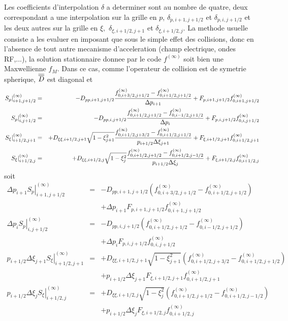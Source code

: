 Les coefficients d'interpolation $\delta $ a determiner sont au nombre de
quatre, deux correspondant a une interpolation sur la grille en $p$, $\delta
_{p,i+1,j+1/2}$ et $\delta _{p,i,j+1/2}$ et les deux autres sur la grille en 
$\xi ,$ $\delta _{\xi ,i+1/2,j+1}$ et $\delta _{\xi ,i+1/2,j}.$ La methode
usuelle consiste a les evaluer en imposant que sous le simple effet des
collisions, donc en l'absence de tout autre mecanisme d'acceleration (champ
electrique, ondes RF,...), la solution stationnaire donnee par le code $%
f^{\left( \infty \right) }$ soit bien une Maxwellienne $f_{M}$. Dans ce cas,
comme l'operateur de collision est de symetrie spherique, $\overline{%
\overline{D}}$ est diagonal et 
\begin{eqnarray*}
\left. S_{p}\right| _{i+1,j+1/2}^{(\infty )} &=&-D_{pp,i+1,j+1/2}\frac{%
f_{0,i+3/2,j+1/2}^{(\infty )}-f_{0,i+1/2,j+1/2}^{(\infty )}}{\Delta p_{i+1}}%
+F_{p,i+1,j+1/2}f_{0,i+1,j+1/2}^{(\infty )} \\
\left. S_{p}\right| _{i,j+1/2}^{(\infty )} &=&-D_{pp,i,j+1/2}\frac{%
f_{0,i+1/2,j+1/2}^{(\infty )}-f_{0,i-1/2,j+1/2}^{(\infty )}}{\Delta p_{i}}%
+F_{p,i,j+1/2}f_{0,i,j+1/2}^{(\infty )} \\
\left. S_{\xi }\right| _{i+1/2,j+1}^{(\infty )} &=&+D_{\xi \xi ,i+1/2,j+1}%
\sqrt{1-\xi _{j+1}^{2}}\frac{f_{0,i+1/2,j+3/2}^{(\infty %
)}-f_{0,i+1/2,j+1/2}^{(\infty )}}{p_{i+1/2}\Delta \xi _{j+1}}+F_{\xi
,i+1/2,j+1}f_{0,i+1/2,j+1}^{(\infty )} \\
\left. S_{\xi }\right| _{i+1/2,j}^{(\infty )} &=&+D_{\xi \xi ,i+1/2,j}\sqrt{%
1-\xi _{j}^{2}}\frac{f_{0,i+1/2,j+1/2}^{(\infty )}-f_{0,i+1/2,j-1/2}^{(%
\infty )}}{p_{i+1/2}\Delta \xi _{j}}+F_{\xi ,i+1/2,j}f_{0,i+1/2,j}^{(\infty %
)}
\end{eqnarray*}
soit 
\begin{eqnarray*}
\Delta p_{i+1}\left. S_{p}\right| _{i+1,j+1/2}^{(\infty )}
&=&-D_{pp,i+1,j+1/2}\left( f_{0,i+3/2,j+1/2}^{(\infty )}-f_{0,i+1/2,j+1/2}^{(%
\infty )}\right)  \\
&&+\Delta p_{i+1}F_{p,i+1,j+1/2}f_{0,i+1,j+1/2}^{(\infty )} \\
\Delta p_{i}\left. S_{p}\right| _{i,j+1/2}^{(\infty )}
&=&-D_{pp,i,j+1/2}\left( f_{0,i+1/2,j+1/2}^{(\infty )}-f_{0,i-1/2,j+1/2}^{(%
\infty )}\right)  \\
&&+\Delta p_{i}F_{p,i,j+1/2}f_{0,i,j+1/2}^{(\infty )} \\
p_{i+1/2}\Delta \xi _{j+1}\left. S_{\xi }\right| _{i+1/2,j+1}^{(\infty )}
&=&+D_{\xi \xi ,i+1/2,j+1}\sqrt{1-\xi _{j+1}^{2}}\left( f_{0,i+1/2,j+3/2}^{(%
\infty )}-f_{0,i+1/2,j+1/2}^{(\infty )}\right)  \\
&&+p_{i+1/2}\Delta \xi _{j+1}F_{\xi ,i+1/2,j+1}f_{0,i+1/2,j+1}^{(\infty )} \\
p_{i+1/2}\Delta \xi _{j}\left. S_{\xi }\right| _{i+1/2,j}^{(\infty )}
&=&+D_{\xi \xi ,i+1/2,j}\sqrt{1-\xi _{j}^{2}}\left( f_{0,i+1/2,j+1/2}^{(%
\infty )}-f_{0,i+1/2,j-1/2}^{(\infty )}\right)  \\
&&+p_{i+1/2}\Delta \xi _{j}F_{\xi ,i+1/2,j}f_{0,i+1/2,j}^{(\infty )}
\end{eqnarray*}

